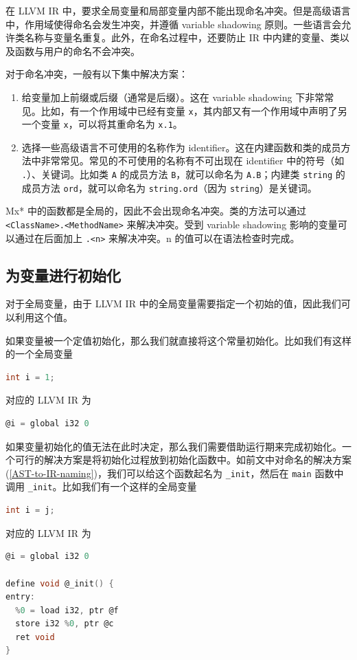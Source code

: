 在 LLVM IR 中，要求全局变量和局部变量内部不能出现命名冲突。但是高级语言中，作用域使得命名会发生冲突，并遵循
variable shadowing 原则。一些语言会允许类名称与变量名重复。此外，在命名过程中，还要防止
IR 中内建的变量、类以及函数与用户的命名不会冲突。

对于命名冲突，一般有以下集中解决方案：
\begin{enumerate}
 \item 给变量加上前缀或后缀（通常是后缀）。这在 variable shadowing 下非常常见。比如，有一个作用域中已经有变量
   \texttt x，其内部又有一个作用域中声明了另一个变量 \texttt x，可以将其重命名为
   \texttt{x.1}。
 \item 选择一些高级语言不可使用的名称作为 identifier。这在内建函数和类的成员方法中非常常见。常见的不可使用的名称有不可出现在
   identifier 中的符号（如 \texttt{.}）、关键词。比如类 \texttt A 的成员方法
   \texttt{B}，就可以命名为 \texttt{A.B}；内建类 \texttt{string} 的成员方法
   \texttt{ord}，就可以命名为 \texttt{string.ord}（因为 \texttt{string}）是关键词。
\end{enumerate}

Mx* 中的函数都是全局的，因此不会出现命名冲突。类的方法可以通过
\texttt{<ClassName>.<MethodName>} 来解决冲突。受到 variable shadowing
影响的变量可以通过在后面加上 \texttt{.<n>} 来解决冲突。n 的值可以在语法检查时完成。

\subsection{为变量进行初始化}\label{AST-to-IR-initializing}

对于全局变量，由于 LLVM IR 中的全局变量需要指定一个初始的值，因此我们可以利用这个值。

如果变量被一个定值初始化，那么我们就直接将这个常量初始化。比如我们有这样的一个全局变量
\begin{lstlisting}[language=C]
int i = 1;
\end{lstlisting}
对应的 LLVM IR 为
\begin{lstlisting}[language=C]
@i = global i32 0
\end{lstlisting}

如果变量初始化的值无法在此时决定，那么我们需要借助运行期来完成初始化。一个可行的解决方案是将初始化过程放到初始化函数中。如前文中对命名的解决方案
(\ref{AST-to-IR-naming})，我们可以给这个函数起名为 \texttt{\_init}，然后在
\texttt{main} 函数中调用 \texttt{\_init}。比如我们有一个这样的全局变量
\begin{lstlisting}[language=C]
int i = j;
\end{lstlisting}
对应的 LLVM IR 为
\begin{lstlisting}[language=C]
@i = global i32 0

define void @_init() {
entry:
  %0 = load i32, ptr @f
  store i32 %0, ptr @c
  ret void
}
\end{lstlisting}

